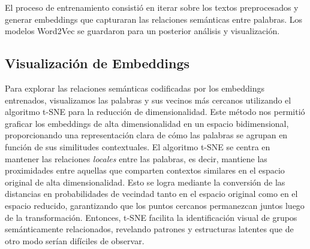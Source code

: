 \documentclass[a4]{article}
\begin{document}
El proceso de entrenamiento consistió en iterar sobre los textos preprocesados y generar embeddings que capturaran las relaciones semánticas entre palabras. Los modelos Word2Vec se guardaron para un posterior análisis y visualización.

\subsection{Visualización de Embeddings}

Para explorar las relaciones semánticas codificadas por los embeddings entrenados, visualizamos las palabras y sus vecinos más cercanos utilizando el algoritmo t-SNE para la reducción de dimensionalidad. Este método nos permitió graficar los embeddings de alta dimensionalidad en un espacio bidimensional, proporcionando una representación clara de cómo las palabras se agrupan en función de sus similitudes contextuales. El algoritmo t-SNE se centra en mantener las relaciones \textit{locales} entre las palabras, es decir, mantiene las proximidades entre aquellas que comparten contextos similares en el espacio original de alta dimensionalidad. Esto se logra mediante la conversión de las distancias en probabilidades de vecindad tanto en el espacio original como en el espacio reducido, garantizando que los puntos cercanos permanezcan juntos luego de la transformación. Entonces, t-SNE facilita la identificación visual de grupos semánticamente relacionados, revelando patrones y estructuras latentes que de otro modo serían difíciles de observar.
\end{document}
